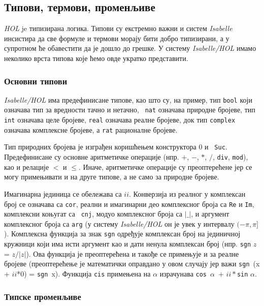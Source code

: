 \subsection{Типови, термови, променљиве}

\emph{HOL} je типизирана логика. Типови су екстремно важни и систем
\emph{Isabelle} инсистира да све формуле и термови морају бити добро
типизирани, а у супротном ће обавестити да је дошло до грешке. У
систему \emph{Isabelle/HOL} имамо неколико врста типова које ћемо овде
укратко представити.


\subsubsection{Основни типови}

\emph{Isabelle/HOL} има предефинисане типове, као што су, на пример,
тип {\tt bool} који означава тип за вредности тачно и нетачно, {\tt
  nat} означава природне бројеве, тип {\tt int} означава целе бројеве,
{\tt real} означава реалне бројеве, док тип {\tt complex} означава
комплексне бројеве, а {\tt rat} рационалне бројеве.

Тип природних бројева је изграђен коришћењем конструктора $0$ и {\tt
  Suc}. Предефинисане су основне аритметичке операције (нпр. $+$, $-$,
$*$, $/$, {\tt div}, {\tt mod}), као и релације $<$ и $\le$. Иначе,
аритметичке операције су преоптерећене јер се могу примењивати и на
друге типове, а не само за природне бројеве.

Имагинарна јединица се обележава са $ii$.  Конверзија из реалног у
комплексан број се означава са {\tt cor}, реални и имагинарни део
комплексног броја са {\tt Re} и {\tt Im}, комплексни коњугат са {\tt
  cnj}, модуо комплексног броја са $|\_|$, и аргумент комплексног
броја са {\tt arg} (у систему \emph{Isabelle/HOL} он је увек у
интервалу $(-\pi, \pi]$). Комплексна функција за знак {\tt sgn}
  одређује комплексан број на јединичној кружници који има исти
  аргумент као и дати ненула комплексан број (нпр. {\tt sgn} $z$ = $z
  / |z|$). Ова функција је преоптерећена и такође се примењује и за
  реалне бројеве (преоптерећење је математички оправдано у овом
  случају јер важи {\tt sgn}\ (x + $ii$*0) = {\tt sgn}\ x).  Функција
  {\tt cis} примењена на $\alpha$ израчунава {\tt cos}\ $\alpha$\ $+$
  $ii*${\tt sin} $\alpha$.

\subsubsection{Типске променљиве}

